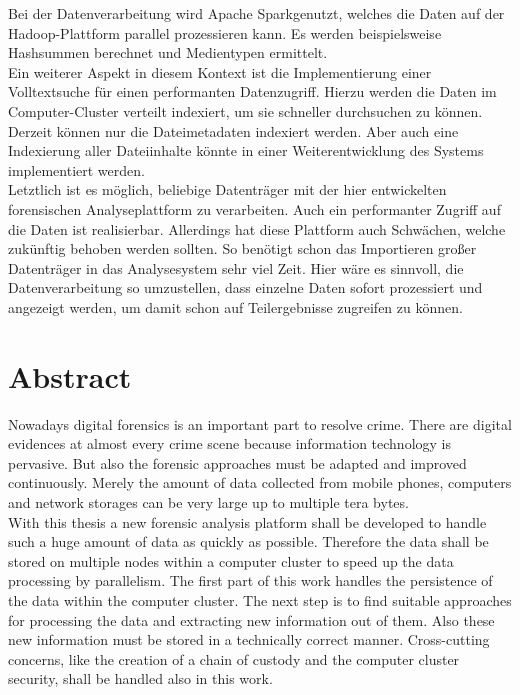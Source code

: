 \noindent
Bei der Datenverarbeitung wird Apache Spark\texttrademark\thinspace genutzt, welches die Daten auf der Hadoop-Plattform parallel prozessieren kann. Es werden beispielsweise Hashsummen berechnet und Medientypen ermittelt.\\
Ein weiterer Aspekt in diesem Kontext ist die Implementierung einer Volltextsuche für einen performanten Datenzugriff. Hierzu werden die Daten im Computer-Cluster verteilt indexiert, um sie schneller durchsuchen zu können. Derzeit können nur die Dateimetadaten indexiert werden. Aber auch eine Indexierung aller Dateiinhalte könnte in einer Weiterentwicklung des Systems implementiert werden.\\

\noindent
Letztlich ist es möglich, beliebige Datenträger mit der hier entwickelten forensischen Analyseplattform zu verarbeiten. Auch ein performanter Zugriff auf die Daten ist realisierbar. Allerdings hat diese Plattform auch Schwächen, welche zukünftig behoben werden sollten. So benötigt schon das Importieren großer Datenträger in das Analysesystem sehr viel Zeit. Hier wäre es sinnvoll, die Datenverarbeitung so umzustellen, dass einzelne Daten sofort prozessiert und angezeigt werden, um damit schon auf Teilergebnisse zugreifen zu können.


\newpage
\section*{Abstract}
Nowadays digital forensics is an important part to resolve crime. There are digital evidences at almost every crime scene because information technology is pervasive. But also the forensic approaches must be adapted and improved continuously. Merely the amount of data collected from mobile phones, computers and network storages  can be very large up to multiple tera bytes.\\

\noindent
With this thesis a new forensic analysis platform shall be developed to handle such a huge amount of data as quickly as possible. Therefore the data shall be stored on multiple nodes within a computer cluster to speed up the data processing by parallelism. The first part of this work handles the persistence of the data within the computer cluster. The next step is to find suitable approaches for processing the data and extracting new information out of them. Also these new information must be stored in a technically correct manner. Cross-cutting concerns, like the creation of a chain of custody and the computer cluster security, shall be handled also in this work.\\


